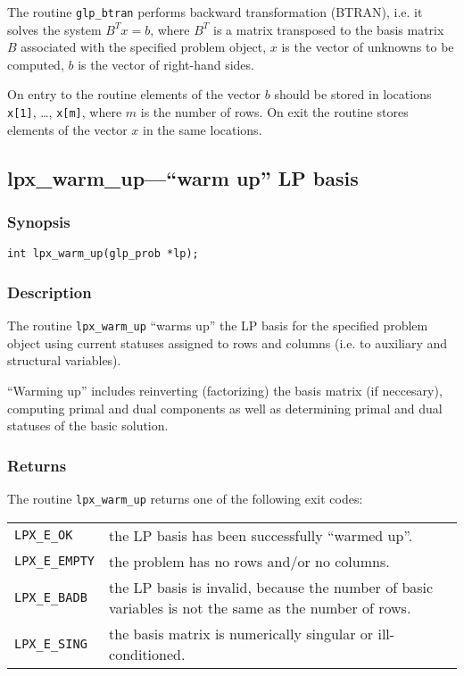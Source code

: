 The routine \verb|glp_btran| performs backward transformation (BTRAN),
i.e. it solves the system $B^Tx=b$, where $B^T$ is a matrix transposed
to the basis matrix $B$ associated with the specified problem object,
$x$ is the vector of unknowns to be computed, $b$ is the vector of
right-hand sides.

On entry to the routine elements of the vector $b$ should be stored in
locations \verb|x[1]|, \dots, \verb|x[m]|, where $m$ is the number of
rows. On exit the routine stores elements of the vector $x$ in the same
locations.


\newpage

\subsection{lpx\_warm\_up---``warm up'' LP basis}

\subsubsection*{Synopsis}

\begin{verbatim}
int lpx_warm_up(glp_prob *lp);
\end{verbatim}

\subsubsection*{Description}

The routine \verb|lpx_warm_up| ``warms up'' the LP basis for the
specified problem object using current statuses assigned to rows and
columns (i.e. to auxiliary and structural variables).

``Warming up'' includes reinverting (factorizing) the basis matrix (if
neccesary), computing primal and dual components as well as determining
primal and dual statuses of the basic solution.

\subsubsection*{Returns}

The routine \verb|lpx_warm_up| returns one of the following exit codes:

\begin{tabular}{@{}p{25mm}p{91.3mm}@{}}
\verb|LPX_E_OK| & the LP basis has been successfully ``warmed up''. \\
\verb|LPX_E_EMPTY|  & the problem has no rows and/or no columns. \\
\verb|LPX_E_BADB|   & the LP basis is invalid, because the number of
   basic variables is not the same as the number of rows. \\
\verb|LPX_E_SING|   & the basis matrix is numerically singular or
   ill-condi\-tioned.
\end{tabular}

